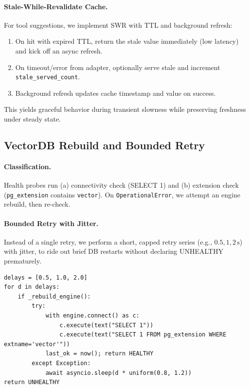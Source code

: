 \documentclass[11pt]{article}
\begin{document}
\paragraph{Stale-While-Revalidate Cache.} For tool suggestions, we implement SWR with TTL and background refresh:
\begin{enumerate}[nosep]
  \item On hit with expired TTL, return the stale value immediately (low latency) and kick off an async refresh.
  \item On timeout/error from adapter, optionally serve stale and increment \texttt{stale\_served\_count}.
  \item Background refresh updates cache timestamp and value on success.
\end{enumerate}
This yields graceful behavior during transient slowness while preserving freshness under steady state.

\subsection{VectorDB Rebuild and Bounded Retry}

\paragraph{Classification.} Health probes run (a) connectivity check (SELECT 1) and (b) extension check (\texttt{pg\_extension} contains \texttt{vector}). On \texttt{OperationalError}, we attempt an engine rebuild, then re-check.

\paragraph{Bounded Retry with Jitter.} Instead of a single retry, we perform a short, capped retry series (e.g., \(0.5,1,2\,\mathrm{s}\)) with jitter, to ride out brief DB restarts without declaring UNHEALTHY prematurely.

\begin{verbatim}
delays = [0.5, 1.0, 2.0]
for d in delays:
    if _rebuild_engine():
        try:
            with engine.connect() as c:
                c.execute(text("SELECT 1"))
                c.execute(text("SELECT 1 FROM pg_extension WHERE extname='vector'"))
            last_ok = now(); return HEALTHY
        except Exception:
            await asyncio.sleep(d * uniform(0.8, 1.2))
return UNHEALTHY
\end{verbatim}
\end{document}
